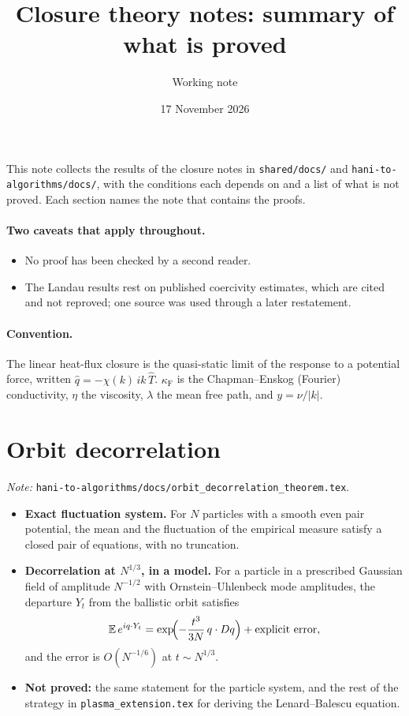 \documentclass[11pt]{article}
\title{Closure theory notes: summary of what is proved}
\author{Working note}
\date{17 November 2026}
\begin{document}
\sloppy
\maketitle

\noindent This note collects the results of the closure notes in
\texttt{shared/docs/} and \texttt{hani-to-algorithms/docs/}, with the
conditions each depends on and a list of what is not proved. Each section
names the note that contains the proofs.

\paragraph{Two caveats that apply throughout.}
\begin{itemize}
  \item No proof has been checked by a second reader.
  \item The Landau results rest on published coercivity estimates, which are
    cited and not reproved; one source was used through a later restatement.
\end{itemize}

\paragraph{Convention.} The linear heat-flux closure is the quasi-static
limit of the response to a potential force, written
$\hat q=-\chi(k)\,ik\,\hat T$. $\kappa_{\mathrm F}$ is the Chapman--Enskog
(Fourier) conductivity, $\eta$ the viscosity, $\lambda$ the mean free path,
and $y=\nu/|k|$.

\section{Orbit decorrelation}

\emph{Note:} \texttt{hani-to-algorithms/docs/orbit\_decorrelation\_theorem.tex}.

\begin{itemize}
  \item \textbf{Exact fluctuation system.} For $N$ particles with a smooth
    even pair potential, the mean and the fluctuation of the empirical
    measure satisfy a closed pair of equations, with no truncation.
  \item \textbf{Decorrelation at $N^{1/3}$, in a model.} For a particle in a
    prescribed Gaussian field of amplitude $N^{-1/2}$ with
    Ornstein--Uhlenbeck mode amplitudes, the departure $Y_t$ from the
    ballistic orbit satisfies
    \[
      \mathbb{E}\,e^{iq\cdot Y_t}=\exp\!\Bigl(-\frac{t^3}{3N}\,q\cdot Dq\Bigr)
      +\text{explicit error},
    \]
    and the error is $O(N^{-1/6})$ at $t\sim N^{1/3}$.
  \item \textbf{Not proved:} the same statement for the particle system, and
    the rest of the strategy in \texttt{plasma\_extension.tex} for deriving
    the Lenard--Balescu equation.
\end{itemize}
\end{document}
